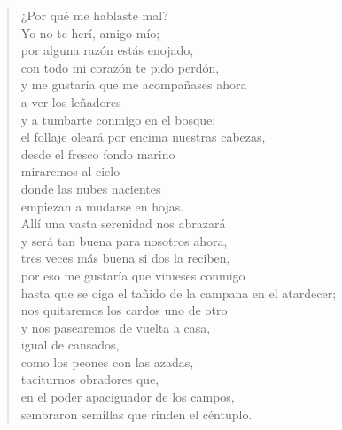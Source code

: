 \documentclass[11pt]{extbook}
\newcommand*{\centeredornament}{\centerline{\pgfornament[width=6cm]{88}}}
\begin{document}
\newpage


\vspace*{-15mm}
\centeredornament



\begin{verse}
  ¿Por qué me hablaste mal? \\
  Yo no te herí, amigo mío; \\
  por alguna razón estás enojado, \\
  con todo mi corazón te pido perdón, \\
  y me gustaría que me acompañases ahora \\
  a ver los leñadores \\
  y a tumbarte conmigo en el bosque; \\
  el follaje oleará por encima nuestras cabezas, \\
  desde el fresco fondo marino \\
  miraremos al cielo \\
  donde las nubes nacientes \\
  empiezan a mudarse en hojas. \\
  Allí una vasta serenidad nos abrazará \\
  y será tan buena para nosotros ahora, \\
  tres veces más buena si dos la reciben, \\
  por eso me gustaría que vinieses conmigo \\
  hasta que se oiga el tañido de la campana en el atardecer; \\
  nos quitaremos los cardos uno de otro \\
  y nos pasearemos de vuelta a casa, \\
  igual de cansados, \\
  como los peones con las azadas, \\
  taciturnos obradores que, \\
  en el poder apaciguador de los campos, \\
  sembraron semillas que rinden el céntuplo.
\end{verse}

\newpage

\vspace*{-15mm}
\centeredornament

\end{document}
